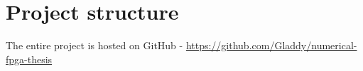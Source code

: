 \chapter{Project structure}
\label{app:project_structure}
The entire project is hosted on GitHub - \url{https://github.com/Gladdy/numerical-fpga-thesis}



